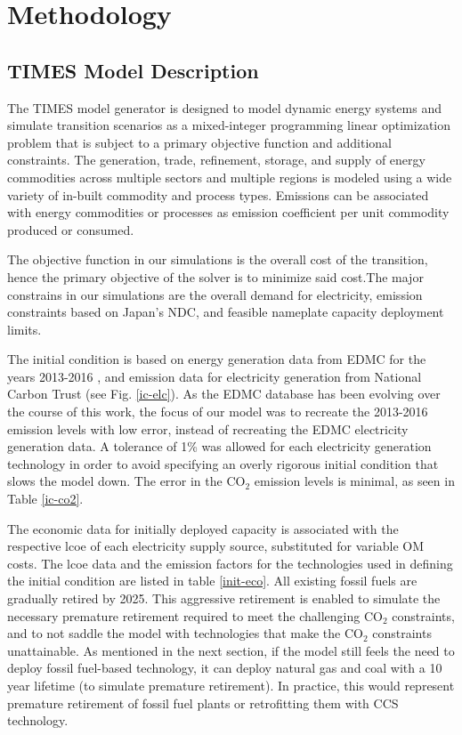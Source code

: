 \section{Methodology} \label{method}

\subsection{TIMES Model Description}
The \gls{TIMES} model generator is designed to model dynamic energy systems and simulate transition scenarios as a mixed-integer programming linear optimization problem that is subject to a primary objective function and additional constraints. The generation, trade, refinement, storage, and supply of energy commodities across multiple sectors and multiple regions is modeled using a wide variety of in-built commodity and process types. Emissions can be associated with energy commodities or processes as emission coefficient per unit commodity produced or consumed. 

The objective function in our simulations is the overall cost of the transition, hence the primary objective of the solver is to minimize said cost.The major constrains in our simulations are the overall demand for electricity, emission constraints based on Japan's \gls{NDC}, and feasible nameplate capacity deployment limits.



The initial condition is based on energy generation data from \gls{EDMC} for the years 2013-2016 , and emission data for electricity generation from National Carbon Trust (see Fig. \ref{ic-elc}). As the \gls{EDMC} database has been evolving over the course of this work, the focus of our model was to recreate the 2013-2016 emission levels with low error, instead of recreating the \gls{EDMC} electricity generation data. A tolerance of 1\% was allowed for each electricity generation technology in order to avoid specifying an overly rigorous initial condition that slows the model down. The error in the CO$_2$ emission levels is minimal, as seen in Table \ref{ic-co2}.

The economic data for initially deployed capacity is associated with the respective \gls{lcoe} of each electricity supply source, substituted for variable \gls{OM} costs. The \gls{lcoe} data and the emission factors for the technologies used in defining the initial condition are listed in table \ref{init-eco}. All existing fossil fuels are gradually retired by 2025. This aggressive retirement is enabled to simulate the necessary premature retirement required to meet the challenging CO$_2$ constraints, and to not saddle the model with technologies that make the CO$_2$ constraints unattainable. As mentioned in the next section, if the model still feels the need to deploy fossil fuel-based technology, it can deploy natural gas and coal with a 10 year lifetime (to simulate premature retirement). In practice, this would represent premature retirement of fossil fuel plants or retrofitting them with \gls{CCS} technology.

